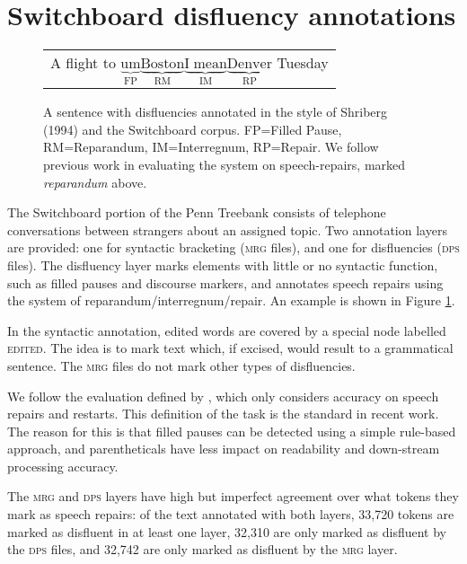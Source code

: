 \documentclass[11pt,letterpaper]{article}
\begin{document}
\section{Switchboard disfluency annotations}
\label{sec:swbd}

\begin{figure}
    \begin{tabular}{l}

        A flight to $\underbrace{\mathrm{um}}_\text{FP} \underbrace{\mathrm{Boston}}_\text{RM} \underbrace{\mathrm{I\;mean}}_\text{IM} \underbrace{\mathrm{Denver}}_\text{RP}$ Tuesday\\

\end{tabular}
\caption{\small A sentence with disfluencies annotated in the style of Shriberg (1994) 
    and the Switchboard corpus.
FP=Filled Pause, RM=Reparandum, IM=Interregnum, RP=Repair.
We follow previous work in evaluating the system on speech-repairs,
marked \emph{reparandum} above.
\label{fig:shriberg}}
\vspace*{-1.5em}
\end{figure}

The Switchboard portion of the Penn Treebank \citep{marcus:93} consists of
telephone conversations between strangers about
an assigned topic.  Two annotation layers are provided: one for syntactic
bracketing (\textsc{mrg} files),
and one for disfluencies (\textsc{dps} files). 
The disfluency layer marks
elements with little or no syntactic function, such as filled pauses and discourse
markers, and annotates speech repairs using the \citet{shriberg:94} system of
reparandum/interregnum/repair. An example is shown in Figure \ref{fig:shriberg}.


In the syntactic annotation, edited words are covered by a special node labelled
\textsc{edited}.
The idea is to mark text which, if
excised, would result to a grammatical sentence.
The \textsc{mrg} files do not mark other types of disfluencies.

We follow the evaluation defined by \citet{Charniak01a}, which only considers
accuracy on speech repairs and restarts.  This definition of the task is the 
standard in recent work. The reason for this is that filled pauses can be
detected using a simple rule-based approach, and parentheticals have less impact
on readability and down-stream processing accuracy.

The \textsc{mrg} and \textsc{dps} layers have high but imperfect agreement over
what tokens they mark as speech repairs: of the text annotated with both layers,
33,720 tokens are marked as disfluent in at least one layer, 32,310 are only marked
as disfluent by the \textsc{dps} files, and 32,742 are only marked as disfluent
by the \textsc{mrg} layer.
\end{document}
